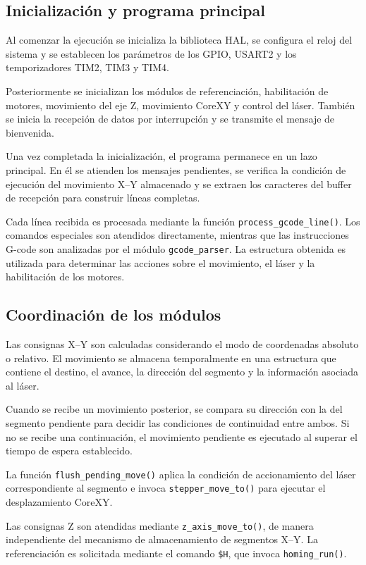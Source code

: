 \documentclass[blue,fullpaper]{ludusofficial}  %
\begin{document}
\subsection{Inicialización y programa principal}

Al comenzar la ejecución se inicializa
la biblioteca HAL, se configura el reloj
del sistema y se establecen los parámetros
de los GPIO, USART2 y los temporizadores
TIM2, TIM3 y TIM4.

Posteriormente se inicializan los módulos
de referenciación, habilitación de motores,
movimiento del eje Z, movimiento CoreXY
y control del láser. También se inicia
la recepción de datos por interrupción
y se transmite el mensaje de bienvenida.

Una vez completada la inicialización,
el programa permanece en un lazo principal.
En él se atienden los mensajes pendientes,
se verifica la condición de ejecución
del movimiento X--Y almacenado y se extraen
los caracteres del buffer de recepción
para construir líneas completas.

Cada línea recibida es procesada mediante
la función \texttt{process\_gcode\_line()}.
Los comandos especiales son atendidos
directamente, mientras que las instrucciones
G-code son analizadas por el módulo
\texttt{gcode\_parser}. La estructura obtenida
es utilizada para determinar las acciones
sobre el movimiento, el láser y la habilitación
de los motores.

\subsection{Coordinación de los módulos}

Las consignas X--Y son calculadas considerando
el modo de coordenadas absoluto o relativo.
El movimiento se almacena temporalmente
en una estructura que contiene el destino,
el avance, la dirección del segmento
y la información asociada al láser.

Cuando se recibe un movimiento posterior,
se compara su dirección con la del segmento
pendiente para decidir las condiciones
de continuidad entre ambos. Si no se recibe
una continuación, el movimiento pendiente
es ejecutado al superar el tiempo de espera
establecido.

La función \texttt{flush\_pending\_move()}
aplica la condición de accionamiento del láser
correspondiente al segmento e invoca
\texttt{stepper\_move\_to()} para ejecutar
el desplazamiento CoreXY.

Las consignas Z son atendidas mediante
\texttt{z\_axis\_move\_to()}, de manera
independiente del mecanismo de almacenamiento
de segmentos X--Y. La referenciación
es solicitada mediante el comando
\texttt{\$H}, que invoca
\texttt{homing\_run()}.
\end{document}

